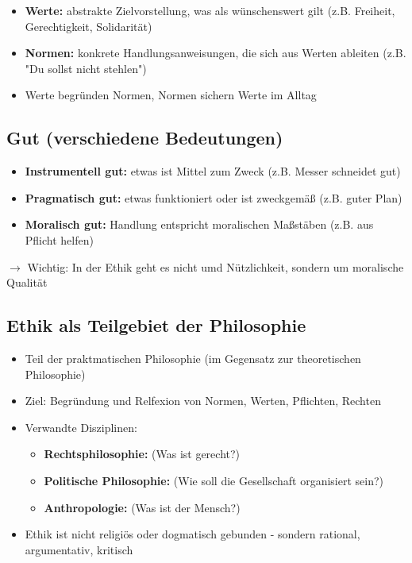\begin{itemize}
    \item \textbf{Werte:} abstrakte Zielvorstellung, was als wünschenswert gilt (z.B. Freiheit, Gerechtigkeit, Solidarität)
    \item \textbf{Normen:} konkrete Handlungsanweisungen, die sich aus Werten ableiten (z.B. "Du sollst nicht stehlen")
    \item Werte begründen Normen, Normen sichern Werte im Alltag
\end{itemize}

\subsection{Gut (verschiedene Bedeutungen)}

\begin{itemize}
    \item \textbf{Instrumentell gut:} etwas ist Mittel zum Zweck (z.B. Messer schneidet gut)
    \item \textbf{Pragmatisch gut:} etwas funktioniert oder ist zweckgemäß (z.B. guter Plan)
    \item \textbf{Moralisch gut:} Handlung entspricht moralischen Maßstäben (z.B. aus Pflicht helfen)
\end{itemize}

$\rightarrow$ Wichtig: In der Ethik geht es nicht umd Nützlichkeit, sondern um moralische Qualität

\subsection{Ethik als Teilgebiet der Philosophie}
\begin{itemize}
    \item Teil der praktmatischen Philosophie (im Gegensatz zur theoretischen Philosophie)
    \item Ziel: Begründung und Relfexion von Normen, Werten, Pflichten, Rechten
    \item Verwandte Disziplinen:
    \begin{itemize}
        \item \textbf{Rechtsphilosophie:} (Was ist gerecht?)
        \item \textbf{Politische Philosophie:} (Wie soll die Gesellschaft organisiert sein?)
        \item \textbf{Anthropologie:} (Was ist der Mensch?)
    \end{itemize}
    \item Ethik ist nicht religiös oder dogmatisch gebunden - sondern rational, argumentativ, kritisch
\end{itemize}

